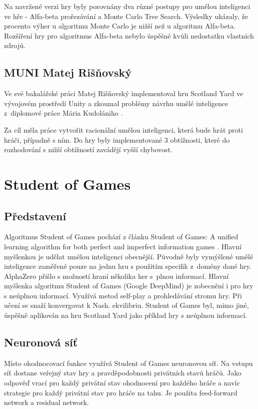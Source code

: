Na navržené verzi hry byly porovnány dva různé postupy pro umělou inteligenci ve hře - Alfa-beta prořezávání a Monte Carlo Tree Search. Výsledky ukázaly, že procento výher u algoritmu Monte Carlo je nižší než u algoritmu Alfa-beta. Rozšíření hry pro algoritmus Alfa-beta nebylo úspěšné kvůli nedostatku vlastních zdrojů.  

\subsection{MUNI Matej Rišňovský}

Ve své bakalářské práci \cite{Risnovsky2020thesis} Matej Rišňovský implementoval hru Scotland Yard ve vývojovém prostředí Unity a zkoumal problémy návrhu umělé inteligence z~diplomové práce Mária Kudolániho \cite{Kudolani2018thesis}. 

Za cíl měla práce vytvořit racionální umělou inteligenci, která bude hrát proti hráči, případně s ním. Do hry byly implementované 3 obtížnosti, které do rozhodování s nižší obtížností zavádějí vyšší chybovost.


\section{Student of Games}

\subsection{Představení}
Algoritmus Student of Games pochází z článku Student of Games: A unified learning algorithm for both perfect and imperfect information games \cite{Schmid_2023}.
Hlavní myšlenkou je udělat umělou inteligenci obecnější. Původně byly vymýšlené umělé inteligence zaměřené pouze na jednu hru s použitím specifik z~domény dané hry. AlphaZero přišlo s možností hraní několika her s~plnou informací. Hlavní myšlenka algoritmu Student of Games (Google DeepMind) je zobecnění i pro hry s neúplnou informací. Využívá metod self-play a prohledávání stromu hry. Při učení se snaží konvergovat k Nash. ekvilibriu. Student of Games byl, mimo jiné, úspěšně aplikován na hru Scotland Yard jako příklad hry s neúplnou informací.

\subsection{Neuronová síť}

Místo ohodnocovací funkce využívá Student of Games neuronovou síť. Na vstupu síť dostane veřejný stav hry a pravděpodobnosti privátních stavů hráčů. Jako odpověď vrací pro každý privátní stav ohodnocení pro každého hráče a navíc strategie pro každý privátní stav pro hráče na tahu. Je použita feed-forward network a residual network.

